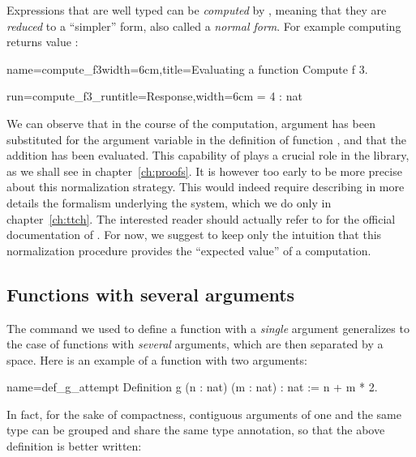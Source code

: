 Expressions that are well typed can be \emph{computed} by \Coq{},
meaning that they are \emph{reduced} to a ``simpler'' form, also
called a \emph{normal form}. For example computing  returns
value :

\begin{coq-left}{name=compute_f3}{width=6cm,title=Evaluating a function}
Compute f 3.
\end{coq-left}
\begin{coqout-right}{run=compute_f3_run}{title=Response,width=6cm}
 = 4 : nat
\end{coqout-right}

We can observe that in the course of the computation, argument  has been
substituted for the argument variable in the definition of function
, and that the addition has been evaluated.
This capability of \Coq{} plays a crucial role
in the \mcbMC{} library, as we shall see in chapter~\ref{ch:proofs}. It
is however too early to be
more precise about this normalization strategy. This would indeed
require describing in more details the formalism underlying the
\Coq{} system, which we do only in chapter~\ref{ch:ttch}. The
interested reader should actually refer to \cite[section
5.3.7, ``Performing computations'']{Coq:manual} for
the official documentation of .
For now, we suggest to keep only the intuition that this
normalization procedure provides the ``expected value'' of a
computation.


\subsection{Functions with several arguments}
\label{sec:fun-sev-args}
The command we used to define a function with a \emph{single} argument
generalizes to the case of functions with \emph{several} arguments, which are
then separated by a space. Here is an example of a function with two
arguments:

\begin{coq}{name=def_g_attempt}{}
Definition g (n : nat) (m : nat) : nat := n + m * 2.
\end{coq}
In fact, for the sake of compactness, contiguous arguments of one and
the same
type can be grouped and share the same type annotation, so that the
above definition is better written:

